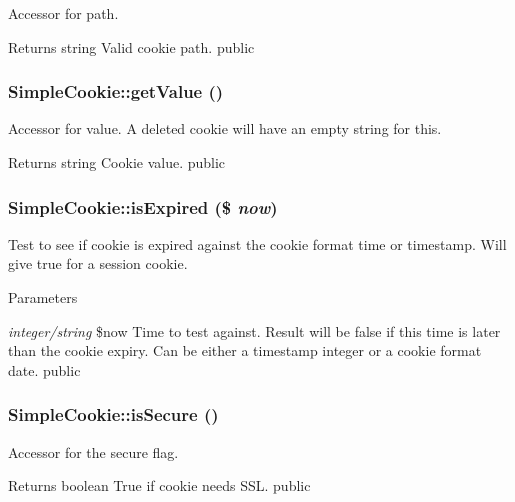 \label{class_simple_cookie_a6b0897c1051d8ff8fa7f3b8e0c70d0ed}
Accessor for path. \begin{DoxyReturn}{Returns}
string Valid cookie path.  public 
\end{DoxyReturn}
\hypertarget{class_simple_cookie_a27a060cd69b4abf9b9483d1b456ba806}{
\subsubsection[{getValue}]{\setlength{\rightskip}{0pt plus 5cm}SimpleCookie::getValue ()}}
\label{class_simple_cookie_a27a060cd69b4abf9b9483d1b456ba806}
Accessor for value. A deleted cookie will have an empty string for this. \begin{DoxyReturn}{Returns}
string Cookie value.  public 
\end{DoxyReturn}
\hypertarget{class_simple_cookie_a7c04a5c207847236bcf64253e1b75b34}{
\subsubsection[{isExpired}]{\setlength{\rightskip}{0pt plus 5cm}SimpleCookie::isExpired (\$ {\em now})}}
\label{class_simple_cookie_a7c04a5c207847236bcf64253e1b75b34}
Test to see if cookie is expired against the cookie format time or timestamp. Will give true for a session cookie. 
\begin{DoxyParams}{Parameters}
\item[{\em integer/string}]\$now Time to test against. Result will be false if this time is later than the cookie expiry. Can be either a timestamp integer or a cookie format date.  public \end{DoxyParams}
\hypertarget{class_simple_cookie_a3eec5b38d439a40df2540e3040ca4849}{
\subsubsection[{isSecure}]{\setlength{\rightskip}{0pt plus 5cm}SimpleCookie::isSecure ()}}
\label{class_simple_cookie_a3eec5b38d439a40df2540e3040ca4849}
Accessor for the secure flag. \begin{DoxyReturn}{Returns}
boolean True if cookie needs SSL.  public 
\end{DoxyReturn}
